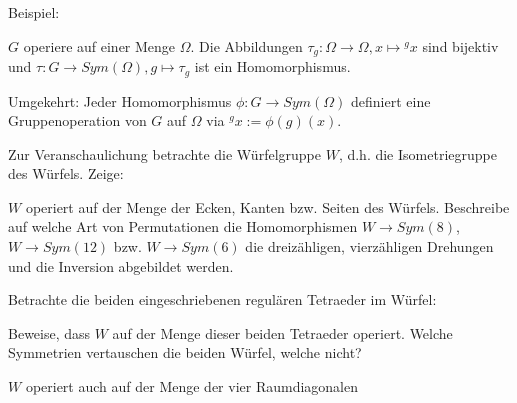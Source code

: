 \begin{sheet}
\begin{problem}[title={Gruppenhomomorphismen}]
Beispiel:
\begin{subproblem}
$G$ operiere auf einer Menge $\Omega$. Die Abbildungen $\tau_g: \Omega\to\Omega, x\mapsto{^g x}$ sind bijektiv und $\tau: G\to Sym(\Omega), g\mapsto\tau_g$ ist ein Homomorphismus.

Umgekehrt: Jeder Homomorphismus $\phi: G\to Sym(\Omega)$ definiert eine Gruppenoperation von $G$ auf $\Omega$ via ${^g x} := \phi(g)(x)$.
\end{subproblem}

Zur Veranschaulichung betrachte die Würfelgruppe $W$, d.h. die Isometriegruppe des Würfels. Zeige:
\begin{subproblem}
$W$ operiert auf der Menge der Ecken, Kanten bzw. Seiten des Würfels. Beschreibe auf welche Art von Permutationen die Homomorphismen $W\to Sym(8)$, $W\to Sym(12)$ bzw. $W\to Sym(6)$ die dreizähligen, vierzähligen Drehungen und die Inversion abgebildet werden.
\end{subproblem}
\begin{subproblem}
Betrachte die beiden eingeschriebenen regulären Tetraeder im Würfel:


Beweise, dass $W$ auf der Menge dieser beiden Tetraeder operiert. Welche Symmetrien vertauschen die beiden Würfel, welche nicht?
\end{subproblem}

\begin{subproblem}
$W$ operiert auch auf der Menge der vier Raumdiagonalen

\end{subproblem}
\end{problem}
\end{sheet}
